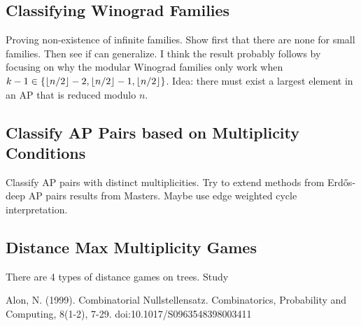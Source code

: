 \documentclass[12]{article}
\DeclarePairedDelimiter\floor{\lfloor}{\rfloor}
\theoremstyle{definition}
\begin{document}
	
	\subsection{Classifying Winograd Families}
	
	Proving non-existence of infinite families.  Show first that there are none for small families.  Then see if can generalize.  I think the result probably follows by focusing on why the modular Winograd families only work when $k-1 \in \{\floor{n/2}-2, \floor{n/2}-1, \floor{n/2}\}$.  Idea: there must exist a largest element in an AP that is reduced modulo $n$.
	
	\subsection{Classify AP Pairs based on Multiplicity Conditions}
	
	Classify AP pairs with distinct multiplicities.  Try to extend methods from Erd\H{o}s-deep AP pairs results from Masters.  Maybe use edge weighted cycle interpretation.
	
	\subsection{Distance Max Multiplicity Games}
	
	There are 4 types of distance games on trees.  Study
	
	\newpage
	\begin{thebibliography}{100}
		 Alon, N. (1999). Combinatorial Nullstellensatz. Combinatorics, Probability and Computing, 8(1-2), 7-29. doi:10.1017/S0963548398003411
	\end{thebibliography}
	
\end{document}
